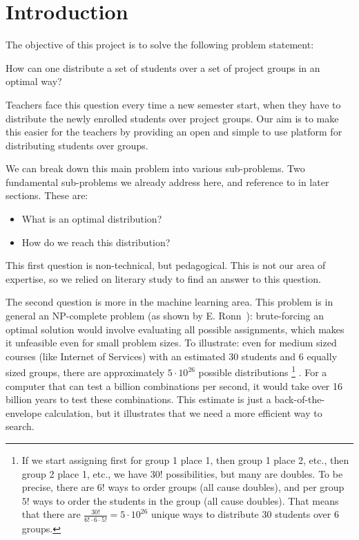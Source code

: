 \section{Introduction}
The objective of this project is to solve the following problem statement:

How can one distribute a set of students over a set of project groups in an optimal way?

Teachers face this question every time a new semester start, when they have to distribute the newly enrolled students over project groups. Our aim is to make this easier for the teachers by providing an open and simple to use platform for distributing students over groups.

We can break down this main problem into various sub-problems. Two fundamental sub-problems we already address here, and reference to in later sections. These are:

\begin{itemize}
	\item What is an optimal distribution?
	\item How do we reach this distribution?
\end{itemize}

This first question is non-technical, but pedagogical. This is not our area of expertise, so we relied on literary study to find an answer to this question.

The second question is more in the machine learning area. This problem is in general an NP-complete problem (as shown by E. Ronn~\cite{ronn1990np}): brute-forcing an optimal solution would involve evaluating all possible assignments, which makes it unfeasible even for small problem sizes.  To illustrate: even for medium sized courses (like Internet of Services) with an estimated 30 students and 6 equally sized groups, there are approximately $5\cdot 10^{26}$ possible distributions
\footnote{
If we start assigning first for group 1 place 1, then group 1 place 2, etc., then group 2 place 1, etc., we have $30!$ possibilities, but many are doubles. To be precise, there are $6!$ ways to order groups (all cause doubles), and per group $5!$ ways to order the students in the group (all cause doubles). That means that there are $\frac{30!}{6! \cdot 6 \cdot 5!} = 5\cdot 10^{26}$ unique ways to distribute 30 students over 6 groups.
}
. For a computer that can test a billion combinations per second, it would take over 16 billion years to test these combinations. This estimate is just a back-of-the-envelope calculation, but it illustrates that we need a more efficient way to search.

